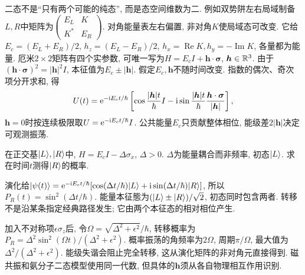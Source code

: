 二态不是“只有两个可能的纯态”, 而是态空间维数为二. 例如双势阱左右局域制备$L,R$中矩阵为$\left(\begin{smallmatrix}E_L&K\\K^*&E_R\end{smallmatrix}\right)$. 对角能量表左右偏置, 非对角$K$使局域态可改变. 它给$E_c=(E_L+E_R)/2$, $h_z=(E_L-E_R)/2$, $h_x=\operatorname{Re}K,h_y=-\operatorname{Im}K$, 各量都为能量. 厄米$2\times2$矩阵有四个实参数, 可唯一写为$H=E_cI+\boldsymbol h\cdot\boldsymbol\sigma$, $\boldsymbol h\in\mathbb R^3$. 由于$(\boldsymbol h\cdot\boldsymbol\sigma)^2=|\boldsymbol h|^2I$, 本征值为$E_c\pm|\boldsymbol h|$. 假定$E_c,\boldsymbol h$不随时间改变. 指数的偶次、奇次项分开求和, 得
\[
U(t)=\mathrm e^{-\mathrm i E_ct/\hbar}\left[
\cos\frac{|\boldsymbol h|t}{\hbar}I
-\mathrm i\sin\frac{|\boldsymbol h|t}{\hbar}\frac{\boldsymbol h\cdot\boldsymbol\sigma}{|\boldsymbol h|}\right],
\]
$\boldsymbol h=0$时按连续极限取$U=\mathrm e^{-\mathrm i E_ct/\hbar}I$. 公共能量$E_c$只贡献整体相位, 能级差$2|\boldsymbol h|$决定可观测振荡.

\begin{example}
在正交基$\lvert L\rangle,\lvert R\rangle$中, $H=E_cI-\Delta\sigma_x$, $\Delta>0$. $\Delta$为能量耦合而非频率, 初态$\lvert L\rangle$. 求在时间$t$测得$\lvert R\rangle$的概率.
\end{example}
\begin{solution}
演化给$\lvert \psi(t)\rangle=\mathrm e^{-\mathrm i E_ct/\hbar}[\cos(\Delta t/\hbar)\lvert L\rangle+\mathrm i\sin(\Delta t/\hbar)\lvert R\rangle]$, 所以$P_R(t)=\sin^2(\Delta t/\hbar)$. 能量本征態为$(\lvert L\rangle\pm\lvert R\rangle)/\sqrt2$, 初态同时包含两者. 转移不是沿某条指定经典路径发生; 它由两个本征态的相对相位产生.
\end{solution}

加入不对称项$\epsilon\sigma_z$后, 令$\Omega=\sqrt{\Delta^2+\epsilon^2}/\hbar$, 转移概率为$P_R=\Delta^2\sin^2(\Omega t)/(\Delta^2+\epsilon^2)$. 概率振荡的角频率为$2\Omega$, 周期$\pi/\Omega$, 最大值为$\Delta^2/(\Delta^2+\epsilon^2)$. 能级失谐会阻止完全转移, 这从演化矩阵的非对角元直接得到. 磁共振和氨分子二态模型使用同一代数, 但具体的$\boldsymbol h$须从各自物理相互作用识别.
